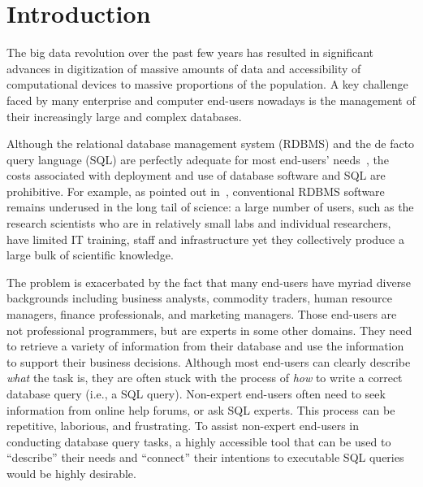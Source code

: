 \section{Introduction}
\label{sec:introduction}


The big data revolution over the past few years has resulted
in significant advances in digitization of massive amounts
of data and accessibility of computational devices to massive
proportions of the population. A key challenge faced by many
enterprise and computer end-users nowadays is the management
of their increasingly large and complex databases.




Although the relational database management system (RDBMS) and the
de facto query language (SQL) are perfectly adequate for most end-users'
needs~\cite{Howe:2011}, the costs associated with deployment and
use of database software and SQL are prohibitive. 
For example, as pointed out in~\cite{Gray:2005},
conventional RDBMS software remains underused
in the long tail of science: a large number of users, such as the
research scientists who are in relatively small labs and individual
researchers, have limited IT training, staff and infrastructure yet
they collectively produce a large bulk of scientific knowledge. 

The problem is exacerbated by the fact that many end-users
have myriad diverse backgrounds including 
business analysts, commodity traders, human resource managers,
finance professionals, and marketing managers. 
Those end-users are not professional programmers, but are experts in some
other domains. They need to retrieve a variety of information from their
database and use the information to support their business decisions.
Although most end-users can clearly describe \textit{what} the task is, they
are often stuck with the process of \textit{how} to
write a correct database query (i.e., a SQL query).
Non-expert end-users often need to
seek information from online help forums, or ask
SQL experts. This process can be repetitive, laborious, and frustrating.
To assist non-expert end-users in conducting database query tasks,
a highly accessible tool that can be used to ``describe''
their needs and ``connect'' their intentions to executable
SQL queries would be highly desirable.

